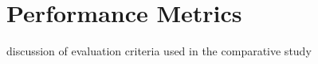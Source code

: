 \section{Performance Metrics}\label{Metrics}

discussion of evaluation criteria used in the comparative study